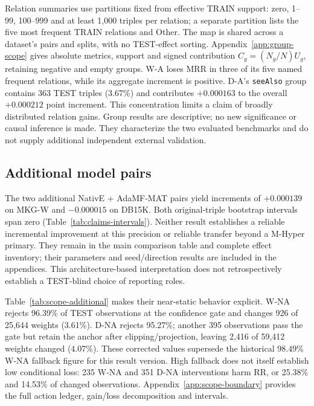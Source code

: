 \documentclass[11pt,a4paper]{article}
\begin{document}
Relation summaries use partitions fixed from effective TRAIN support: zero, 1--99, 100--999 and at least 1,000 triples per relation; a separate partition lists the five most frequent TRAIN relations and Other. The map is shared across a dataset's pairs and splits, with no TEST-effect sorting. Appendix~\ref{app:group-scope} gives absolute metrics, support and signed contribution $C_g=(N_g/N)U_g$, retaining negative and empty groups. W-A loses MRR in three of its five named frequent relations, while its aggregate increment is positive. D-A's \texttt{seeAlso} group contains 363 TEST triples (3.67\%) and contributes $+0.000163$ to the overall $+0.000212$ point increment. This concentration limits a claim of broadly distributed relation gains. Group results are descriptive; no new significance or causal inference is made. They characterize the two evaluated benchmarks and do not supply additional independent external validation.
\FloatBarrier

\subsection{Additional model pairs}
\label{sec:scope-cost}
The two additional NativE + AdaMF-MAT pairs yield increments of $+0.000139$ on MKG-W and $-0.000015$ on DB15K. Both original-triple bootstrap intervals span zero (Table~\ref{tab:claims-intervals}). Neither result establishes a reliable incremental improvement at this precision or reliable transfer beyond a M-Hyper primary. They remain in the main comparison table and complete effect inventory; their parameters and seed/direction results are included in the appendices. This architecture-based interpretation does not retrospectively establish a TEST-blind choice of reporting roles.

Table~\ref{tab:scope-additional} makes their near-static behavior explicit. W-NA rejects 96.39\% of TEST observations at the confidence gate and changes 926 of 25,644 weights (3.61\%). D-NA rejects 95.27\%; another 395 observations pass the gate but retain the anchor after clipping/projection, leaving 2,416 of 59,412 weights changed (4.07\%). These corrected values supersede the historical 98.49\% W-NA fallback figure for this result version. High fallback does not itself establish low conditional loss: 235 W-NA and 351 D-NA interventions harm RR, or 25.38\% and 14.53\% of changed observations. Appendix~\ref{app:scope-boundary} provides the full action ledger, gain/loss decomposition and intervals.

\end{document}

